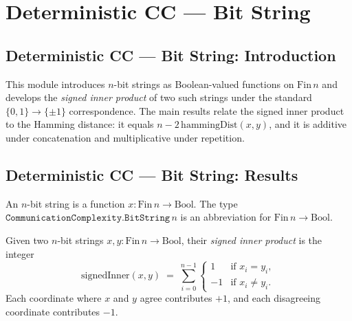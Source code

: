 \section{Deterministic CC --- Bit String}
\subsection*{Deterministic CC --- Bit String: Introduction}

This module introduces $n$-bit strings as Boolean-valued functions on $\mathrm{Fin}\,n$
and develops the \emph{signed inner product} of two such strings under the standard
$\{0,1\} \to \{\pm 1\}$ correspondence.  The main results relate the signed inner
product to the Hamming distance: it equals $n - 2\,\mathrm{hammingDist}(x,y)$, and it
is additive under concatenation and multiplicative under repetition.

\subsection*{Deterministic CC --- Bit String: Results}

\begin{definition}
\label{CommunicationComplexity.BitString}
\leanok
An $n$-bit string is a function $x : \mathrm{Fin}\,n \to \mathrm{Bool}$.
The type $\texttt{CommunicationComplexity.BitString}\,n$ is an abbreviation for
$\mathrm{Fin}\,n \to \mathrm{Bool}$.
\end{definition}

\begin{definition}
\label{CommunicationComplexity.BitString.signedInner}
\leanok
{}
Given two $n$-bit strings $x, y : \mathrm{Fin}\,n \to \mathrm{Bool}$, their
\emph{signed inner product} is the integer
\[
  \mathrm{signedInner}(x, y) \;=\; \sum_{i=0}^{n-1}
    \begin{cases} 1 & \text{if } x_i = y_i,\\ -1 & \text{if } x_i \neq y_i.\end{cases}
\]
Each coordinate where $x$ and $y$ agree contributes $+1$, and each disagreeing
coordinate contributes $-1$.
\end{definition}


